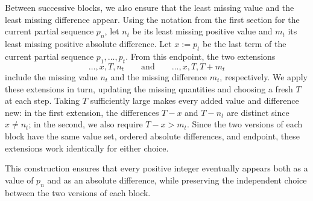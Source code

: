 \documentclass[11pt,a4paper]{article}
\theoremstyle{definition}
\theoremstyle{remark}
\numberwithin{equation}{section}
\begin{document}
Between successive blocks, we also ensure that the least missing value and
the least missing difference appear. Using the notation from the first section
for the current partial sequence $p_n$, let $n_t$ be its least missing positive
value and $m_t$ its least missing positive absolute difference. Let $x:=p_t$
be the last term of the current partial sequence $p_1,\ldots,p_t$.
From this endpoint, the two extensions
\[
  \ldots,x,T,n_t
  \qquad\text{and}\qquad
  \ldots,x,T,T+m_t
\]
include the missing value $n_t$ and the missing difference $m_t$, respectively.
We apply these extensions in turn, updating the missing quantities and choosing
a fresh $T$ at each step. Taking $T$ sufficiently large makes every added value
and difference new: in the first extension, the differences $T-x$ and $T-n_t$
are distinct since $x\ne n_t$; in the second, we also require $T-x>m_t$.
Since the two versions of each block have the same value set, ordered absolute
differences, and endpoint, these extensions work identically for either choice.

This construction ensures that every positive integer eventually appears both
as a value of $p_n$ and as an absolute difference, while preserving the independent
choice between the two versions of each block.

\\
\end{document}
